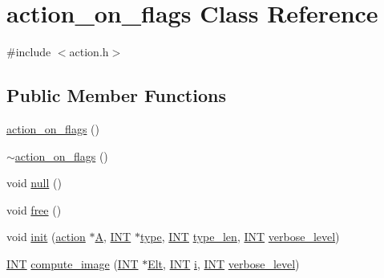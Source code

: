 \hypertarget{classaction__on__flags}{}\section{action\+\_\+on\+\_\+flags Class Reference}
\label{classaction__on__flags}


{\ttfamily \#include $<$action.\+h$>$}

\subsection*{Public Member Functions}
\begin{DoxyCompactItemize}
\item 
\mbox{\hyperlink{classaction__on__flags_a8bb1c84b70732c6cf77d25e4f7c0dcb6}{action\+\_\+on\+\_\+flags}} ()
\item 
\mbox{\hyperlink{classaction__on__flags_aabddfcaaee1534c9107cfba890551888}{$\sim$action\+\_\+on\+\_\+flags}} ()
\item 
void \mbox{\hyperlink{classaction__on__flags_ac2894bc8c10e10e1c1ac784a8f7e0d03}{null}} ()
\item 
void \mbox{\hyperlink{classaction__on__flags_abf9fe3d87034e76fe685ea45ea280133}{free}} ()
\item 
void \mbox{\hyperlink{classaction__on__flags_aad56abe238e588bdc368c6396d3813dc}{init}} (\mbox{\hyperlink{classaction}{action}} $\ast$\mbox{\hyperlink{classaction__on__flags_af161710bdb8f1be19186f478b7c4bf56}{A}}, \mbox{\hyperlink{galois_8h_a09fddde158a3a20bd2dcadb609de11dc}{I\+NT}} $\ast$\mbox{\hyperlink{classaction__on__flags_a358929581b44014351a7501202d14b17}{type}}, \mbox{\hyperlink{galois_8h_a09fddde158a3a20bd2dcadb609de11dc}{I\+NT}} \mbox{\hyperlink{classaction__on__flags_aa83def90a92203f4a639ff4af313540b}{type\+\_\+len}}, \mbox{\hyperlink{galois_8h_a09fddde158a3a20bd2dcadb609de11dc}{I\+NT}} \mbox{\hyperlink{simeon_8_c_a818073fbcc2f439e7c56952f67386122}{verbose\+\_\+level}})
\item 
\mbox{\hyperlink{galois_8h_a09fddde158a3a20bd2dcadb609de11dc}{I\+NT}} \mbox{\hyperlink{classaction__on__flags_a64570f1e5af9e1767802941da51cd6b5}{compute\+\_\+image}} (\mbox{\hyperlink{galois_8h_a09fddde158a3a20bd2dcadb609de11dc}{I\+NT}} $\ast$\mbox{\hyperlink{simeon_8_c_aec1406935bdb1fee3561fcb840964100}{Elt}}, \mbox{\hyperlink{galois_8h_a09fddde158a3a20bd2dcadb609de11dc}{I\+NT}} \mbox{\hyperlink{alphabet2_8_c_acb559820d9ca11295b4500f179ef6392}{i}}, \mbox{\hyperlink{galois_8h_a09fddde158a3a20bd2dcadb609de11dc}{I\+NT}} \mbox{\hyperlink{simeon_8_c_a818073fbcc2f439e7c56952f67386122}{verbose\+\_\+level}})
\end{DoxyCompactItemize}
